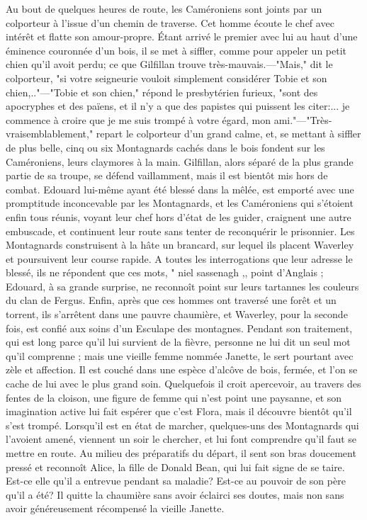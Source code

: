 Au bout de quelques heures de route, les Caméroniens sont joints par un colporteur à l'issue d'un chemin de traverse. Cet homme écoute le chef avec intérêt et flatte son amour-propre. Étant arrivé le premier avec lui au haut d'une éminence couronnée d'un bois, il se met à siffler, comme pour appeler un petit chien qu'il avoit perdu; ce que Gilfillan trouve très-mauvais.—"Mais," dit le colporteur, "si votre seigneurie vouloit simplement considérer Tobie et son chien,.."—"Tobie et son chien," répond le presbytérien furieux, "sont des apocryphes et des païens, et il n'y a que des papistes qui puissent les citer:... je commence à croire que je me suis trompé à votre égard, mon ami."—"Très-vraisemblablement," repart le colporteur d'un grand calme, et, se mettant à siffler de plus belle, cinq ou six Montagnards cachés dans le bois fondent sur les Caméroniens, leurs claymores à la main. Gilfillan, alors séparé de la plus grande partie de sa troupe, se défend vaillamment, mais\setcounter{page}{219} il est bientôt mis hors de combat. Edouard lui-même ayant été blessé dans la mêlée, est emporté avec une promptitude inconcevable par les Montagnards, et les Caméroniens qui s'étoient enfin tous réunis, voyant leur chef hors d'état de les guider, craignent une autre embuscade, et continuent leur route sans tenter de reconquérir le prisonnier.
Les Montagnards construisent à la hâte un brancard, sur lequel ils placent Waverley et poursuivent leur course rapide. A toutes les interrogations que leur adresse le blessé, ils ne répondent que ces mots, " niel sassenagh ,, point d'Anglais ; Edouard, à sa grande surprise, ne reconnoît point sur leurs tartannes les couleurs du clan de Fergus. Enfin, après que ces hommes ont traversé une forêt et un torrent, ils s'arrêtent dans une pauvre chaumière, et Waverley, pour la seconde fois, est confié aux soins d'un Esculape des montagnes. Pendant son traitement, qui est long parce qu'il lui survient de la fièvre, personne ne lui dit un seul mot qu'il comprenne ; mais une vieille femme nommée Janette, le sert pourtant avec zèle et affection. Il est couché dans une espèce d'alcôve de bois, fermée, et l'on se cache de lui avec le plus grand soin. Quelquefois il croit\setcounter{page}{220} apercevoir, au travers des fentes de la cloison, une figure de femme qui n'est point une paysanne, et son imagination active lui fait espérer que c'est Flora, mais il découvre bientôt qu'il s'est trompé. Lorsqu'il est en état de marcher, quelques-uns des Montagnards qui l'avoient amené, viennent un soir le chercher, et lui font comprendre qu'il faut se mettre en route. Au milieu des préparatifs du départ, il sent son bras doucement pressé et reconnoît Alice, la fille de Donald Bean, qui lui fait signe de se taire. Est-ce elle qu'il a entrevue pendant sa maladie? Est-ce au pouvoir de son père qu'il a été? Il quitte la chaumière sans avoir éclairci ses doutes, mais non sans avoir généreusement récompensé la vieille Janette.
